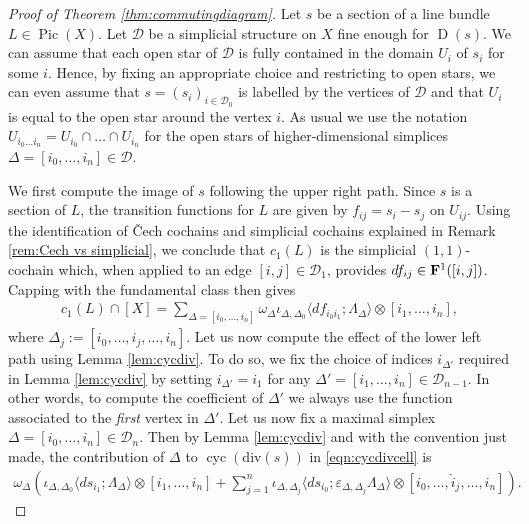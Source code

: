 \documentclass[11pt]{article}
\numberwithin{equation}{numsection}
\renewcommand{\div}{\mathrm{div}}
\newcommand{\DD}{\mathcal{D}}
\newcommand{\diff}{d}
\DeclareMathOperator{\Pic}{Pic}
\DeclareMathOperator{\cyc}{cyc}
\DeclareMathOperator{\ND}{D}
\begin{document}
\begin{proof}[Proof of Theorem \ref{thm:commutingdiagram}]
Let $s$ be a section of a line bundle $L \in \Pic(X)$. 
Let  $\DD$ be a simplicial structure on $X$ fine enough for $\ND(s)$.
We can assume that each open star of $\DD$ is fully contained in the domain $U_i$ of $s_i$
for some $i$. Hence, by fixing an appropriate choice and restricting to open stars, 
we can even assume that $s = (s_i)_{i\in \DD_0}$ is labelled by the vertices of $\DD$ and
that $U_i$ is equal to the open star around the vertex $i$. As usual we use the notation
$U_{i_0 \dots i_n} = U_{i_0} \cap \dots \cap U_{i_n}$ for the open stars of higher-dimensional simplices
$\Delta = [i_0, \dots, i_n] \in \DD$. 


We first compute the image of  $s$  following the upper right path.
Since $s$ is a section of $L$, the transition functions for $L$ are given
by $f_{ij} = s_i - s_j$ on $U_{ij}$. Using the identification 
of \v{C}ech cochains and simplicial cochains explained in Remark \ref{rem:Cech vs simplicial}, 
we conclude that $c_1(L)$ is the simplicial $(1,1)$-cochain which, when applied to an edge $[i,j] \in \DD_1$,
provides $\diff f_{ij} \in {\bf F}^1([i,j])$. 
Capping with the fundamental class then gives
\begin{align} \label{lower left}
c_1(L) \cap [X] = \sum_{\Delta = [i_0,\dots,i_n]} \omega_\Delta  
\iota_{\Delta, \Delta_0} \langle  d f_{i_0 i_1}; \Lambda_\Delta \rangle \otimes [i_1,\dots,i_n],
\end{align}
where $\Delta_j := [i_0, \ldots,  \hat{i}_j, \ldots, i_n]$.
Let us now compute the effect of the lower left path using Lemma \ref{lem:cycdiv}. 
To do so, we fix the choice of indices $i_{\Delta'}$ required in  Lemma \ref{lem:cycdiv} by setting
$i_{\Delta'} = i_1$ for any $\Delta' = [i_1, \dots, i_n] \in \DD_{n-1}$.
In other words, to compute the coefficient of $\Delta'$ we always use the function associated to 
the \textit{first} vertex in $\Delta'$.
Let us now fix a maximal simplex $\Delta = [i_0, \dots, i_n] \in \DD_{n}$.
Then by Lemma \ref{lem:cycdiv} and with the convention just made, the contribution of  
 $\Delta$ to  $\cyc(\div(s))$ in \eqref{eqn:cycdivcell} is 
\begin{align*}
 \omega_\Delta  \left(  \iota_{\Delta, \Delta_0} \langle d s_{i_1}; \Lambda_{\Delta} \rangle \otimes  [i_1, \ldots, i_n] +  
\sum_{j=1}^n  \iota_{\Delta, \Delta_j} \langle d s_{i_0}; \varepsilon_{\Delta, \Delta_j} \Lambda_\Delta \rangle 
\otimes  [i_0, \ldots,  \hat{i}_j, \ldots, i_n]\right).
\end{align*}

\end{proof}
\end{document}
